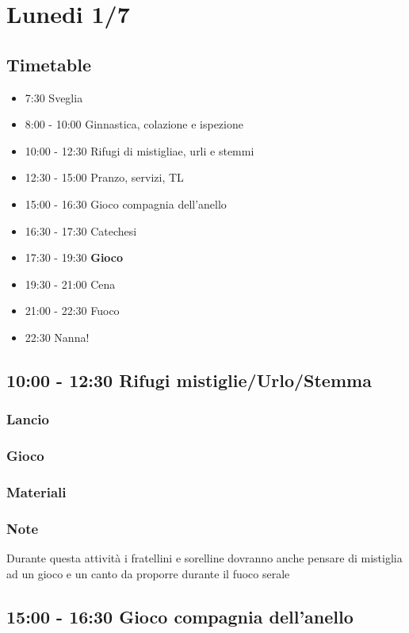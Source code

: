 \documentclass[../main.tex]{subfiles}
\begin{document}
   \section{Lunedi 1/7}
   \subsection{Timetable}
   \begin{itemize}
        \item 7:30 Sveglia
        \item 8:00 - 10:00 Ginnastica, colazione e ispezione
        \item 10:00 - 12:30 Rifugi di mistigliae, urli e stemmi
        \item 12:30 - 15:00 Pranzo, servizi, TL
        \item 15:00 - 16:30 Gioco compagnia dell'anello
        \item 16:30 - 17:30 Catechesi
        \item 17:30 - 19:30 \textbf{Gioco}
        \item 19:30 - 21:00 Cena
        \item 21:00 - 22:30 Fuoco
        \item 22:30 Nanna!
    \end{itemize}

   \subsection{10:00 - 12:30 Rifugi mistiglie/Urlo/Stemma}
       \subsubsection{Lancio}
        \subsubsection{Gioco}
        \subsubsection{Materiali}
        \subsubsection{Note}
        Durante questa attività i fratellini e sorelline dovranno anche pensare di mistiglia ad un gioco e un canto da proporre durante il fuoco serale
        
    \subsection{15:00 - 16:30 Gioco compagnia dell'anello}
\end{document}
